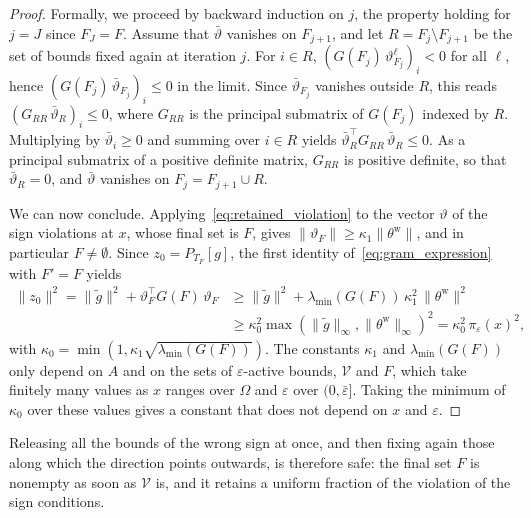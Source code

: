 \documentclass{article}
\numberwithin{equation}{section}
\newcommand{\proj}[2]{P_{#1} \left[ {#2} \right]} %
\theoremstyle{plain}
\begin{document}
\begin{proof}
	Formally, we proceed by backward induction on $j$, the property holding for $j = J$ since $F_J = F$. Assume that $\bar\vartheta$ vanishes on $F_{j+1}$, and let $R = F_j\setminus F_{j+1}$ be the set of bounds fixed again at iteration $j$. For $i \in R$, $(G(F_j)\,\vartheta^\ell_{F_j})_i < 0$ for all $\ell$, hence $(G(F_j)\,\bar\vartheta_{F_j})_i \le 0$ in the limit. Since $\bar\vartheta_{F_j}$ vanishes outside $R$, this reads $(G_{RR}\,\bar\vartheta_R)_i \le 0$, where $G_{RR}$ is the principal submatrix of $G(F_j)$ indexed by $R$. Multiplying by $\bar\vartheta_i \ge 0$ and summing over $i \in R$ yields $\bar\vartheta_R^\top G_{RR}\,\bar\vartheta_R \le 0$. As a principal submatrix of a positive definite matrix, $G_{RR}$ is positive definite, so that $\bar\vartheta_R = 0$, and $\bar\vartheta$ vanishes on $F_j = F_{j+1}\cup R$.

	We can now conclude. Applying~\eqref{eq:retained_violation} to the vector $\vartheta$ of the sign violations at $x$, whose final set is $F$, gives $\|\vartheta_F\| \ge \kappa_1\|\theta^{\mathrm{w}}\|$, and in particular $F \ne \emptyset$. Since $z_0 = \proj{T_F}{g}$, the first identity of~\eqref{eq:gram_expression} with $F' = F$ yields
	\begin{align*}
		\|z_0\|^2 = \|\tilde{g}\|^2 + \vartheta_F^\top G(F)\,\vartheta_F &\ge \|\tilde{g}\|^2 + \lambda_{\min}(G(F))\,\kappa_1^2\,\|\theta^{\mathrm{w}}\|^2 \\
		&\ge \kappa_0^2 \max\left(\|\tilde{g}\|_\infty,\|\theta^{\mathrm{w}}\|_\infty\right)^2 = \kappa_0^2\,\pi_\varepsilon(x)^2,
	\end{align*}
	with $\kappa_0 = \min\left(1, \kappa_1\sqrt{\lambda_{\min}(G(F))}\right)$. The constants $\kappa_1$ and $\lambda_{\min}(G(F))$ only depend on $A$ and on the sets of $\varepsilon$-active bounds, $\mathcal{V}$ and $F$, which take finitely many values as $x$ ranges over $\Omega$ and $\varepsilon$ over $(0,\bar\varepsilon]$. Taking the minimum of $\kappa_0$ over these values gives a constant that does not depend on $x$ and $\varepsilon$.
\end{proof}
Releasing all the bounds of the wrong sign at once, and then fixing again those along which the direction points outwards, is therefore safe: the final set $F$ is nonempty as soon as $\mathcal{V}$ is, and it retains a uniform fraction of the violation of the sign conditions.
\end{document}
